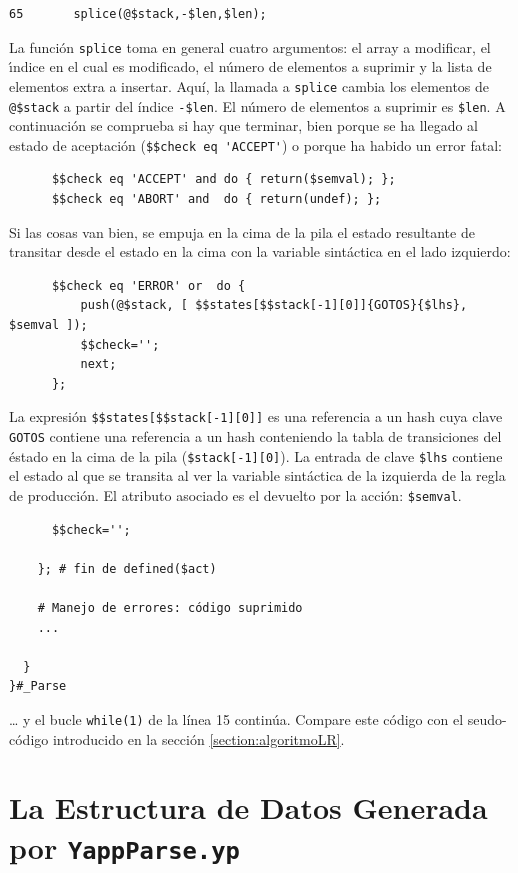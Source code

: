 \begin{verbatim}
65       splice(@$stack,-$len,$len);
\end{verbatim}
La funci\'on \verb|splice| toma en general cuatro argumentos:
el array a modificar, el \'{\i}ndice en el cual es modificado,
el n\'umero de elementos a suprimir y la lista de elementos
extra a insertar. Aquí, la llamada a \verb|splice| cambia los elementos de
\verb|@$stack| a partir del índice \verb|-$len|.
El número de elementos a suprimir es \verb|$len|.  
A continuación se comprueba si hay que terminar, bien 
porque se ha llegado al estado de aceptación (\verb|$$check eq 'ACCEPT'|)
o porque ha habido un error fatal:
\begin{verbatim}
      $$check eq 'ACCEPT' and do { return($semval); };
      $$check eq 'ABORT' and  do { return(undef); };
\end{verbatim}
Si las cosas van bien, se empuja en la cima de la pila el estado
resultante de transitar desde el estado en la cima con la variable
sintáctica en el lado izquierdo:
\begin{verbatim}
      $$check eq 'ERROR' or  do { 
          push(@$stack, [ $$states[$$stack[-1][0]]{GOTOS}{$lhs}, $semval ]);
          $$check='';
          next;
      };
\end{verbatim}
La expresión \verb|$$states[$$stack[-1][0]]| es una referencia a un hash cuya
clave \verb|GOTOS| contiene una referencia a un hash conteniendo la 
tabla de transiciones del éstado en la cima de la pila (\verb|$stack[-1][0]|).
La entrada de clave \verb|$lhs| contiene el estado al que se transita al ver la
variable sintáctica de la izquierda de la regla de producción. El atributo
asociado es el devuelto por la acción: \verb|$semval|.
\begin{verbatim}
      $$check='';

    }; # fin de defined($act)

    # Manejo de errores: código suprimido
    ... 

  }
}#_Parse
\end{verbatim}
\ldots{} y el bucle \verb|while(1)| de la línea 15 continúa.  
Compare este código con el seudo-código introducido
en la sección \ref{section:algoritmoLR}.

\section{La Estructura de Datos Generada por {\tt YappParse.yp}}
%
%
%

